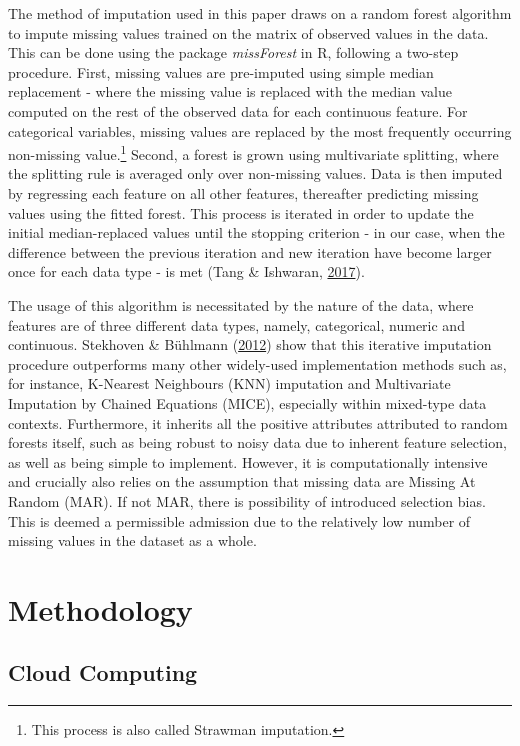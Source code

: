 \documentclass[11pt,preprint, authoryear]{elsarticle}
\numberwithin{equation}{section}
\numberwithin{figure}{section}
\numberwithin{table}{section}
\let\rmarkdownfootnote\footnote%
\def\footnote{\protect\rmarkdownfootnote}
\begin{document}
The method of imputation used in this paper draws on a random forest
algorithm to impute missing values trained on the matrix of observed
values in the data. This can be done using the package \emph{missForest}
in R, following a two-step procedure. First, missing values are
pre-imputed using simple median replacement - where the missing value is
replaced with the median value computed on the rest of the observed data
for each continuous feature. For categorical variables, missing values
are replaced by the most frequently occurring non-missing
value.\footnote{This process is also called Strawman imputation.}
Second, a forest is grown using multivariate splitting, where the
splitting rule is averaged only over non-missing values. Data is then
imputed by regressing each feature on all other features, thereafter
predicting missing values using the fitted forest. This process is
iterated in order to update the initial median-replaced values until the
stopping criterion - in our case, when the difference between the
previous iteration and new iteration have become larger once for each
data type - is met (Tang \& Ishwaran,
\protect\hyperlink{ref-tang2017random}{2017}).

The usage of this algorithm is necessitated by the nature of the data,
where features are of three different data types, namely, categorical,
numeric and continuous. Stekhoven \& Bühlmann
(\protect\hyperlink{ref-stekhoven2012missforest}{2012}) show that this
iterative imputation procedure outperforms many other widely-used
implementation methods such as, for instance, K-Nearest Neighbours (KNN)
imputation and Multivariate Imputation by Chained Equations (MICE),
especially within mixed-type data contexts. Furthermore, it inherits all
the positive attributes attributed to random forests itself, such as
being robust to noisy data due to inherent feature selection, as well as
being simple to implement. However, it is computationally intensive and
crucially also relies on the assumption that missing data are Missing At
Random (MAR). If not MAR, there is possibility of introduced selection
bias. This is deemed a permissible admission due to the relatively low
number of missing values in the dataset as a whole.

\hypertarget{methodology}{%
\section{\texorpdfstring{Methodology
\label{Meth}}{Methodology }}\label{methodology}}

\hypertarget{cloud-computing}{%
\subsection*{Cloud Computing}\label{cloud-computing}}
\end{document}
